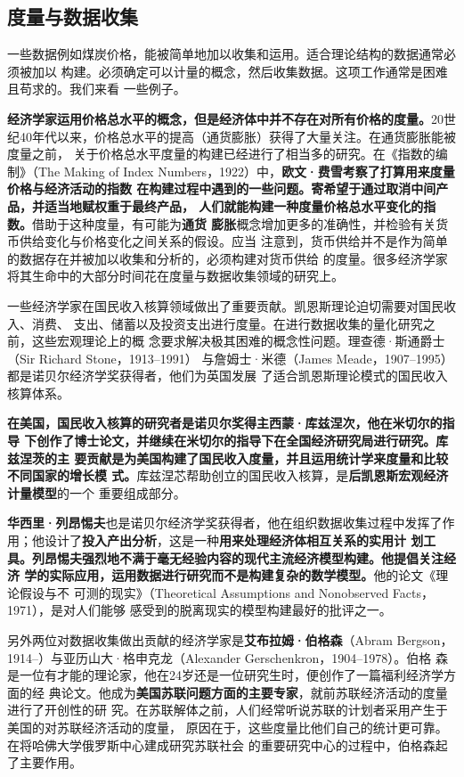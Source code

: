 \subsection{度量与数据收集}

一些数据例如煤炭价格，能被简单地加以收集和运用。适合理论结构的数据通常必须被加以
构建。必须确定可以计量的概念，然后收集数据。这项工作通常是困难且苟求的。我们来看
一些例子。

\textbf{经济学家运用价格总水平的概念，但是经济体中并不存在对所有价格的度量。}20世
纪40年代以来，价格总水平的提高（通货膨胀）获得了大量关注。在通货膨胀能被度量之前，
关于价格总水平度量的构建已经进行了相当多的研究。在《指数的编制》（The Making of
Index Numbers，1922）中，\textbf{欧文·费雪考察了打算用来度量价格与经济活动的指数
  在构建过程中遇到的一些问题。寄希望于通过取消中间产品，并适当地赋权重于最终产品，
  人们就能构建一种度量价格总水平变化的指数。}借助于这种度量，有可能为\textbf{通货
  膨胀}概念增加更多的准确性，并检验有关货币供给变化与价格变化之间关系的假设。应当
注意到，货币供给并不是作为简单的数据存在并被加以收集和分析的，必须构建对货币供给
的度量。很多经济学家将其生命中的大部分时间花在度量与数据收集领域的研究上。

一些经济学家在国民收入核算领域做出了重要贡献。凯恩斯理论迫切需要对国民收入、消费、
支出、储蓄以及投资支出进行度量。在进行数据收集的量化研究之前，这些宏观理论上的概
念要求解决极其困难的概念性问题。理查德·斯通爵士（Sir Richard Stone，1913--1991）
与詹姆士·米德（James Meade，1907--1995）都是诺贝尔经济学奖获得者，他们为英国发展
了适合凯恩斯理论模式的国民收入核算体系。

\textbf{在美国，国民收入核算的研究者是诺贝尔奖得主西蒙·库兹涅次，他在米切尔的指导
  下创作了博士论文，并继续在米切尔的指导下在全国经济研究局进行研究。库兹涅茨的主
  要贡献是为美国构建了国民收入度量，并且运用统计学来度量和比较不同国家的增长模
  式。}库兹涅芯帮助创立的国民收入核算，是\textbf{后凯恩斯宏观经济计量模型}的一个
重要组成部分。

\textbf{华西里·列昂惕夫}也是诺贝尔经济学奖获得者，他在组织数据收集过程中发挥了作
用；他设计了\textbf{投入产出分析}，这是一种\textbf{用来处理经济体相互关系的实用计
  划工具。列昂惕夫强烈地不满于毫无经验内容的现代主流经济模型构建。他提倡关注经济
  学的实际应用，运用数据进行研究而不是构建复杂的数学模型。}他的论文《理论假设与不
可测的现实》（Theoretical Assumptions and Nonobserved Facts，1971），是对人们能够
感受到的脱离现实的模型构建最好的批评之一。

另外两位对数据收集做出贡献的经济学家是\textbf{艾布拉姆·伯格森}（Abram
Bergson，1914--）与亚历山大·格申克龙（Alexander Gerschenkron，1904--1978）。伯格
森是一位有才能的理论家，他在24岁还是一位研究生时，便创作了一篇福利经济学方面的经
典论文。他成为\textbf{美国苏联问题方面的主要专家}，就前苏联经济活动的度量进行了开创性的研
究。在苏联解体之前，人们经常听说苏联的计划者采用产生于美国的对苏联经济活动的度量，
原因在于，这些度量比他们自己的统计更可靠。在将哈佛大学俄罗斯中心建成研究苏联社会
的重要研究中心的过程中，伯格森起了主要作用。

